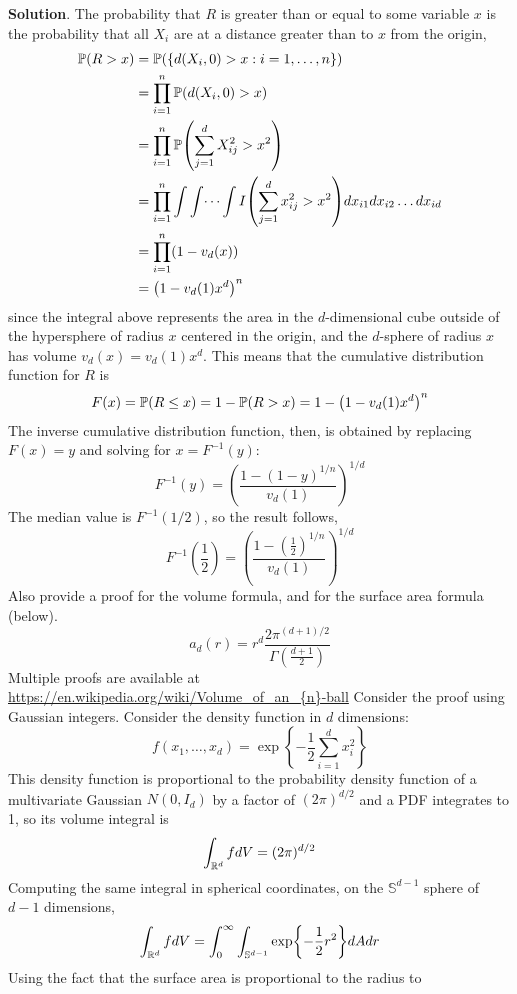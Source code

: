 \textbf{Solution}.
The probability that \(R\) is greater than or equal to some variable
\(x\) is the probability that all \(X_{i}\) are at a distance greater than
to \(x\) from the origin,
\begin{align*}
\PROB(R > x) &= \PROB(\{ d(X_{i}, 0) > x : i = 1, \dots, n \}) \\
&= \prod_{i=1}^{n} \PROB( d(X_{i}, 0) > x  ) \\
&= \prod_{i=1}^{n} \PROB\left( \sum_{j=1}^{d} X_{ij}^{2} > x^{2}  \right) \\
&= \prod_{i=1}^{n} \int \int \dots \int I \left( \sum_{j=1}^{d} x_{ij}^{2} > x^{2} \right) dx_{i1} dx_{i2} \dots dx_{id} \\
&= \prod_{i=1}^{n} (1 - v_d(x)) \\
&= \left(1 - v_d(1) x^{d}\right)^{n}
\end{align*}
since the integral above represents the area in the \(d\)-dimensional
cube outside of the hypersphere of radius \(x\) centered in the origin,
and the \(d\)-sphere of radius \(x\) has volume \(v_d(x) = v_d(1) x^{d}\).
This means that the cumulative distribution function for \(R\) is
\[
F(x) = \PROB(R \leq x) = 1 - \PROB(R > x) = 1 - \left(1 - v_d(1) x^{d}\right)^{n}
\]
The inverse cumulative distribution function, then, is obtained by
replacing \(F(x) = y\) and solving for \(x = F^{-1}(y)\):
\[
F^{-1}(y) = \left( \frac{1 - (1 - y)^{1/n}}{v_d(1)} \right)^{1/d}
\]
The median value is \(F^{-1}(1/2)\), so the result follows,
\[
F^{-1}\left( \frac{1}{2} \right) = \left( \frac{1 - \left( \frac{1}{2} \right)^{1/n}}{v_d(1)} \right)^{1/d}
\]
Also provide a proof for the volume formula, and for the surface
area formula (below).
\[
a_d(r) = r^{d} \frac{2 \pi^{(d + 1)/2}}{\Gamma \left( \frac{d + 1}{2}\right)} 
\]
Multiple proofs are available at
\url{https://en.wikipedia.org/wiki/Volume\_of\_an_{n}-ball}
Consider the proof using Gaussian integers.
Consider the density function in \(d\) dimensions:
\[
f(x_{1}, \dots, x_d) = \exp \left\{ -\frac{1}{2} \sum_{i=1}^{d} x_{i}^{2} \right\}
\]
This density function is proportional to the probability density
function of a multivariate Gaussian \(N(0, I_d)\) by a factor of
\((2 \pi)^{d/2}\) and a PDF integrates to 1, so its volume integral is
\[
\int_{\mathbb{R}^{d}} f dV = (2 \pi)^{d/2}
\]
Computing the same integral in spherical coordinates, on the
\(\mathbb{S}^{d - 1}\) sphere of \(d - 1\) dimensions,
\[
\int_{\R^{d}} f dV = \int_{0}^{\infty} \int_{\mathbb{S}^{d - 1}} \exp \left\{ -\frac{1}{2} r^{2} \right\} dA dr
\]
Using the fact that the surface area is proportional to the radius to
